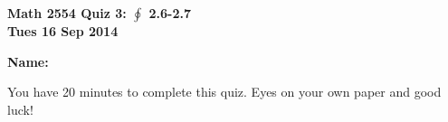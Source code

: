 \documentclass[11pt,letterpaper]{article}
\begin{document}
\flushleft
\begin{multicols}{2}

\begin{large}\textbf{Math 2554 Quiz 3: $\oint $ 2.6-2.7 \\
Tues 16 Sep 2014}\end{large}

\hfill\textbf{Name:  }\underline{\hspace{40ex}} %

\vspace{.5in}

\end{multicols}

\pagestyle{empty}

\flushleft

You have 20 minutes to complete this quiz.  Eyes on your own paper and good luck!
\end{document}
